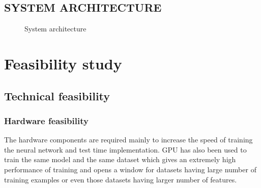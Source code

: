 \documentclass[12pt,a4paper]{report}
\begin{document}
\section{SYSTEM ARCHITECTURE}
\begin{figure}[h]
		\begin{center}
			\caption{System architecture}
		\end{center}
\end{figure}
\newpage
\chapter{Feasibility study}
\newpage
\section{Technical feasibility}
\subsection{Hardware feasibility}
The hardware components are required mainly to increase the speed of training
the neural network and test time implementation. GPU has also been used to train
the same model and the same dataset which gives an extremely high performance of
training and opens a window for datasets having large number of training examples
or even those datasets having larger number of features.
\end{document}
